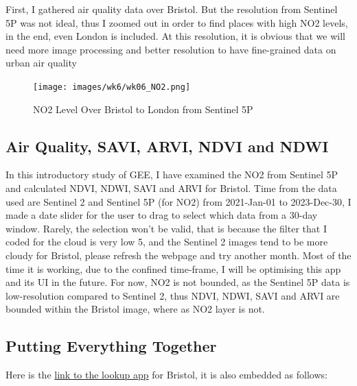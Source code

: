 \documentclass[
  letterpaper,
  DIV=11,
  numbers=noendperiod]{scrreprt}
\begin{document}

First, I gathered air quality data over Bristol. But the resolution from
Sentinel 5P was not ideal, thus I zoomed out in order to find places
with high NO2 levels, in the end, even London is included. At this
resolution, it is obvious that we will need more image processing and
better resolution to have fine-grained data on urban air quality

\begin{figure}

{\centering \texttt{[image: images/wk6/wk06\_NO2.png]}

}

\caption{NO2 Level Over Bristol to London from Sentinel 5P}

\end{figure}

\hypertarget{air-quality-savi-arvi-ndvi-and-ndwi}{%
\subsection*{Air Quality, SAVI, ARVI, NDVI and
NDWI}\label{air-quality-savi-arvi-ndvi-and-ndwi}}

In this introductory study of GEE, I have examined the NO2 from Sentinel
5P and calculated NDVI, NDWI, SAVI and ARVI for Bristol. Time from the
data used are Sentinel 2 and Sentinel 5P (for NO2) from 2021-Jan-01 to
2023-Dec-30, I made a date slider for the user to drag to select which
data from a 30-day window. Rarely, the selection won't be valid, that is
because the filter that I coded for the cloud is very low 5, and the
Sentinel 2 images tend to be more cloudy for Bristol, please refresh the
webpage and try another month. Most of the time it is working, due to
the confined time-frame, I will be optimising this app and its UI in the
future. For now, NO2 is not bounded, as the Sentinel 5P data is
low-resolution compared to Sentinel 2, thus NDVI, NDWI, SAVI and ARVI
are bounded within the Bristol image, where as NO2 layer is not.

\hypertarget{putting-everything-together}{%
\subsection*{Putting Everything
Together}\label{putting-everything-together}}

Here is the
\href{https://ee-mengyu-derek-ding.projects.earthengine.app/view/brsitol-ndvindwiarvisavi-lookup}{link
to the lookup app} for Bristol, it is also embedded as follows:
\end{document}
